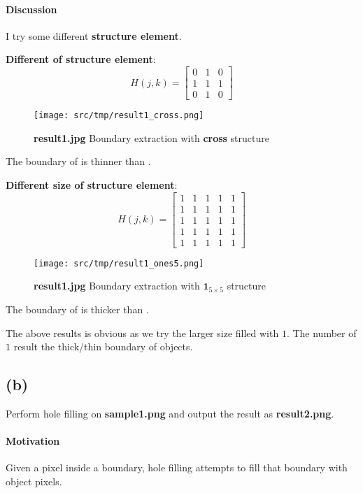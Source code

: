 \paragraph{Discussion}
I try some different \textbf{structure element}.

\textbf{Different of structure element}:
\[
    H(j, k) = \begin{bmatrix}
	0 & 1 & 0\\
	1 & 1 & 1\\
	0 & 1 & 0
    \end{bmatrix}
\]
\begin{figure}
    \centering
    \texttt{[image: src/tmp/result1\_cross.png]}
    \caption{\textbf{result1.jpg} Boundary extraction with \textbf{cross} structure}
    \label{result1_cross}
\end{figure}
The boundary of  is thinner than .

\textbf{Different size of structure element}:
\[
    H(j, k) = \begin{bmatrix}
	1 & 1 & 1 & 1 & 1\\
	1 & 1 & 1 & 1 & 1\\
	1 & 1 & 1 & 1 & 1\\
	1 & 1 & 1 & 1 & 1\\
	1 & 1 & 1 & 1 & 1
    \end{bmatrix}
\]
\begin{figure}
    \centering
    \texttt{[image: src/tmp/result1\_ones5.png]}
    \caption{\textbf{result1.jpg} Boundary extraction with \(\mathbf{1}_{5 \times 5}\) structure}
    \label{result1_ones5}
\end{figure}
The boundary of  is thicker than .

The above results is obvious as we try the larger size filled with \(1\). The number of \(1\) result the thick/thin boundary of objects.

\subsection{(b)}\label{1_b}
Perform hole filling on \textbf{sample1.png} and output the result as \textbf{result2.png}.

\paragraph{Motivation}
Given a pixel inside a boundary, hole filling attempts to fill that boundary with object pixels.

